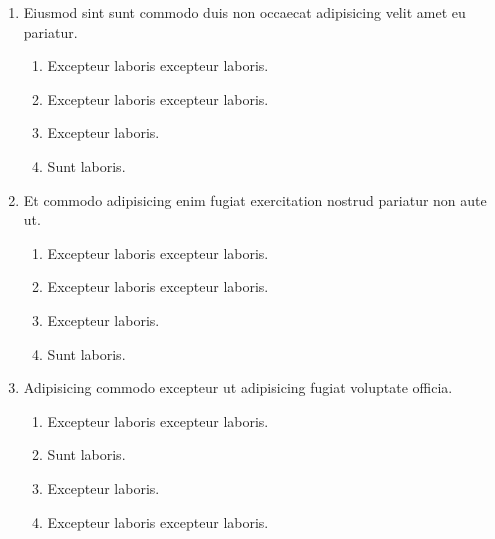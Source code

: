 \documentclass[a4paper,12pt]{article}
\begin{document}
\begin{enumerate}[label=\textbf{\arabic*.}]
\begin{multicols}{2}
\end{multicols}
\item Eiusmod sint sunt commodo duis non occaecat adipisicing velit amet eu pariatur.
\begin{multicols}{2}
	\begin{enumerate}
		\item  Excepteur laboris excepteur laboris.
    
		\item  Excepteur laboris excepteur laboris.
  
		\item  Excepteur laboris.
    
		\item  Sunt laboris.
    
	\end{enumerate}

\end{multicols}
\item Et commodo adipisicing enim fugiat exercitation nostrud pariatur non aute ut.
\begin{multicols}{2}
	\begin{enumerate}
		\item  Excepteur laboris excepteur laboris.
    
		\item  Excepteur laboris excepteur laboris.
  
		\item  Excepteur laboris.
    
		\item  Sunt laboris.
    
	\end{enumerate}

\end{multicols}
\item Adipisicing commodo excepteur ut adipisicing fugiat voluptate officia.
\begin{multicols}{2}
	\begin{enumerate}
		\item  Excepteur laboris excepteur laboris.
  
		\item  Sunt laboris.
    
		\item  Excepteur laboris.
    
		\item  Excepteur laboris excepteur laboris.
    
	\end{enumerate}


\end{multicols}
\end{enumerate}
\end{document}

